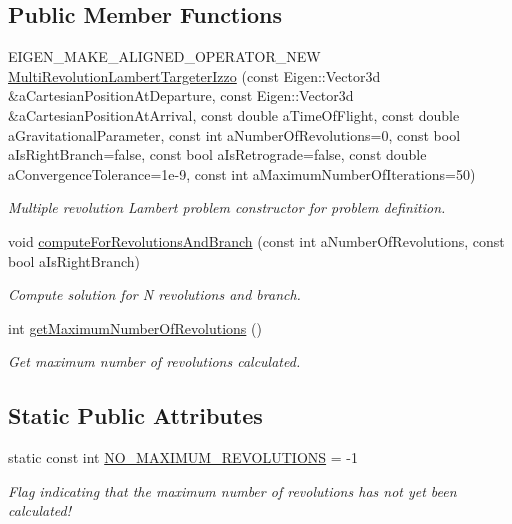 \subsection*{Public Member Functions}
\begin{DoxyCompactItemize}
\item 
E\+I\+G\+E\+N\+\_\+\+M\+A\+K\+E\+\_\+\+A\+L\+I\+G\+N\+E\+D\+\_\+\+O\+P\+E\+R\+A\+T\+O\+R\+\_\+\+N\+EW \hyperlink{classtudat_1_1mission__segments_1_1MultiRevolutionLambertTargeterIzzo_afe0dfe9e561220642db5a438b8518a47}{Multi\+Revolution\+Lambert\+Targeter\+Izzo} (const Eigen\+::\+Vector3d \&a\+Cartesian\+Position\+At\+Departure, const Eigen\+::\+Vector3d \&a\+Cartesian\+Position\+At\+Arrival, const double a\+Time\+Of\+Flight, const double a\+Gravitational\+Parameter, const int a\+Number\+Of\+Revolutions=0, const bool a\+Is\+Right\+Branch=false, const bool a\+Is\+Retrograde=false, const double a\+Convergence\+Tolerance=1e-\/9, const int a\+Maximum\+Number\+Of\+Iterations=50)
\begin{DoxyCompactList}\small\item\em Multiple revolution Lambert problem constructor for problem definition. \end{DoxyCompactList}\item 
void \hyperlink{classtudat_1_1mission__segments_1_1MultiRevolutionLambertTargeterIzzo_a043cf2017321acf61c66d0e1b3854cd2}{compute\+For\+Revolutions\+And\+Branch} (const int a\+Number\+Of\+Revolutions, const bool a\+Is\+Right\+Branch)
\begin{DoxyCompactList}\small\item\em Compute solution for N revolutions and branch. \end{DoxyCompactList}\item 
int \hyperlink{classtudat_1_1mission__segments_1_1MultiRevolutionLambertTargeterIzzo_a631d7f7fafb29a70736339d8880b9573}{get\+Maximum\+Number\+Of\+Revolutions} ()
\begin{DoxyCompactList}\small\item\em Get maximum number of revolutions calculated. \end{DoxyCompactList}\end{DoxyCompactItemize}
\subsection*{Static Public Attributes}
\begin{DoxyCompactItemize}
\item 
static const int \hyperlink{classtudat_1_1mission__segments_1_1MultiRevolutionLambertTargeterIzzo_a13989fb53b66d6f5ddc3eb3283a9dd0d}{N\+O\+\_\+\+M\+A\+X\+I\+M\+U\+M\+\_\+\+R\+E\+V\+O\+L\+U\+T\+I\+O\+NS} = -\/1
\begin{DoxyCompactList}\small\item\em Flag indicating that the maximum number of revolutions has not yet been calculated! \end{DoxyCompactList}\end{DoxyCompactItemize}
